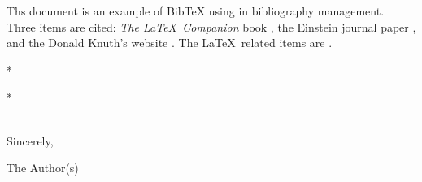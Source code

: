 \documentclass[A4,12pt]{acmemo} %
\begin{document}
\maketitle %


Ths document is an example of BibTeX using in bibliography management. Three items 
are cited: \textit{The \LaTeX\ Companion} book \cite{latexcompanion}, the Einstein
journal paper \cite{einstein}, and the Donald Knuth's website \cite{knuthwebsite}. 
The \LaTeX\ related items are \cite{latexcompanion,knuthwebsite}. 

\bigskip
\noindent
*
\begin{center} * \end{center}
\hfill *\\
\noindent
Sincerely,


\bigskip
The Author(s)



\end{document}
